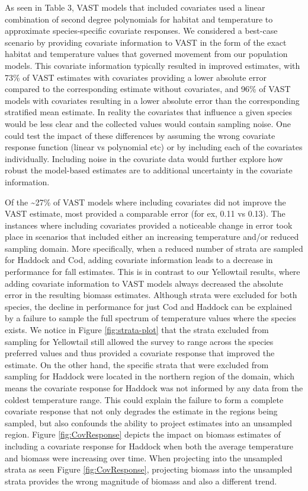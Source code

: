 \documentclass[
  12pt,
]{article}
\begin{document}
As seen in Table 3, VAST models that included covariates used a linear combination of second degree polynomials for habitat and temperature to approximate species-specific covariate responses. We considered a best-case scenario by providing covariate information to VAST in the form of the exact habitat and temperature values that governed movement from our population models. This covariate information typically resulted in improved estimates, with 73\% of VAST estimates with covariates providing a lower absolute error compared to the corresponding estimate without covariates, and 96\% of VAST models with covariates resulting in a lower absolute error than the corresponding stratified mean estimate. In reality the covariates that influence a given species would be less clear and the collected values would contain sampling noise. One could test the impact of these differences by assuming the wrong covariate response function (linear vs polynomial etc) or by including each of the covariates individually. Including noise in the covariate data would further explore how robust the model-based estimates are to additional uncertainty in the covariate information.

Of the \textasciitilde27\% of VAST models where including covariates did not improve the VAST estimate, most provided a comparable error (for ex, 0.11 vs 0.13). The instances where including covariates provided a noticeable change in error took place in scenarios that included either an increasing temperature and/or reduced sampling domain. More specifically, when a reduced number of strata are sampled for Haddock and Cod, adding covariate information leads to a decrease in performance for fall estimates. This is in contrast to our Yellowtail results, where adding covariate information to VAST models always decreased the absolute error in the resulting biomass estimates. Although strata were excluded for both species, the decline in performance for just Cod and Haddock can be explained by a failure to sample the full spectrum of temperature values where the species exists. We notice in Figure \ref{fig:strata-plot} that the strata excluded from sampling for Yellowtail still allowed the survey to range across the species preferred values and thus provided a covariate response that improved the estimate. On the other hand, the specific strata that were excluded from sampling for Haddock were located in the northern region of the domain, which means the covariate response for Haddock was not informed by any data from the coldest temperature range. This could explain the failure to form a complete covariate response that not only degrades the estimate in the regions being sampled, but also confounds the ability to project estimates into an unsampled region. Figure \ref{fig:CovResponse} depicts the impact on biomass estimates of including a covariate response for Haddock when both the average temperature and biomass were increasing over time. When projecting into the unsampled strata as seen Figure \ref{fig:CovResponse}, projecting biomass into the unsampled strata provides the wrong magnitude of biomass and also a different trend.
\end{document}
